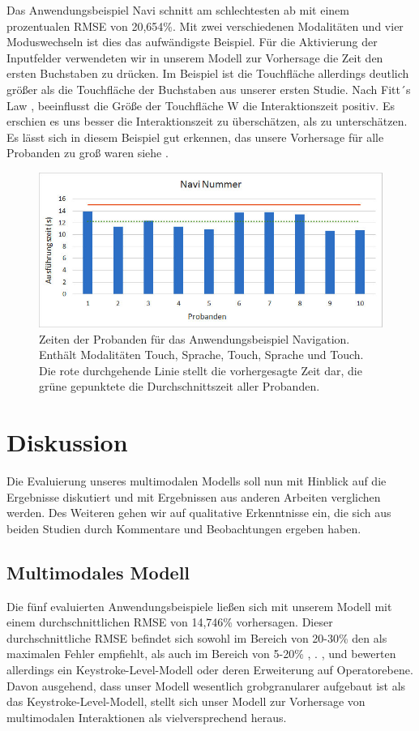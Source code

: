 Das Anwendungsbeispiel Navi schnitt am schlechtesten ab mit einem prozentualen RMSE von 20,654\%. Mit zwei verschiedenen Modalitäten und vier Moduswechseln ist dies das aufwändigste Beispiel. Für die Aktivierung der Inputfelder verwendeten wir in unserem Modell zur Vorhersage die Zeit den ersten Buchstaben zu drücken. Im Beispiel ist die Touchfläche allerdings deutlich größer als die Touchfläche der Buchstaben aus unserer ersten Studie. Nach Fitt´s Law \citep{fitts1954information}, \citep{sasangohar2009evaluation}
beeinflusst die Größe der Touchfläche W die Interaktionszeit positiv. Es erschien es uns besser die Interaktionszeit zu überschätzen, als zu unterschätzen. Es lässt sich in diesem Beispiel gut erkennen, das unsere Vorhersage für alle Probanden zu groß waren siehe .
\begin{figure}
	\centering
		\includegraphics[width=1\textwidth]{img/Navi_Times.jpg}
	\caption[Zeiten der Probanden für das Anwendungsbeispiel Navigation.]{Zeiten der Probanden für das Anwendungsbeispiel Navigation. Enthält Modalitäten Touch, Sprache, Touch, Sprache und Touch. Die rote durchgehende Linie stellt die vorhergesagte Zeit dar, die grüne gepunktete die Durchschnittszeit aller Probanden.}
	\label{fig:Navi_Times}
\end{figure}
\section[Diskussion]{Diskussion}
Die Evaluierung unseres multimodalen Modells soll nun mit Hinblick auf die Ergebnisse diskutiert und mit Ergebnissen aus anderen Arbeiten verglichen werden. Des Weiteren gehen wir auf qualitative Erkenntnisse ein, die sich aus beiden Studien durch Kommentare und Beobachtungen ergeben haben.

\subsection[Modell]{Multimodales Modell}
Die fünf evaluierten Anwendungsbeispiele ließen sich mit unserem Modell mit einem durchschnittlichen RMSE von 14,746\% vorhersagen. Dieser durchschnittliche RMSE befindet sich sowohl im Bereich von 20-30\% den \citet{Card_1980} als maximalen Fehler empfiehlt, als auch im Bereich von 5-20\% \citep{Luo_2005}, \citep{Teo:2006}. \citet{Card_1980}, \citet{Luo_2005} und \citet{Teo:2006} bewerten allerdings ein Keystroke-Level-Modell oder deren Erweiterung auf Operatorebene. Davon ausgehend, dass unser Modell wesentlich grobgranularer aufgebaut ist als das Keystroke-Level-Modell, stellt sich unser Modell zur Vorhersage von multimodalen Interaktionen als vielversprechend heraus. 

